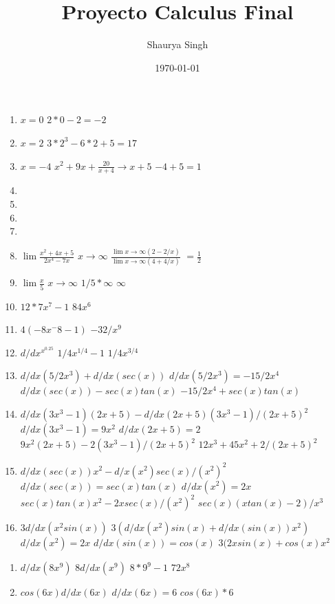 \documentclass[11pt]{article}
\author{Shaurya Singh}
\date{\today}
\title{Proyecto Calculus Final}
\begin{document}
\maketitle
\tableofcontents

\begin{enumerate}
\item \(x=0\)
\(2*0-2= -2\)

\item \(x=2\)
\(3*2^3-6*2+5 = 17\)

\item \(x=-4\)
\(x^2+9x+\frac{20}{x+4} \rightarrow x+5\)
\(-4+5 = 1\)

\item 


\item 


\item 


\item 


\item \(\lim \frac{x^2+4x+5}{2x^{4}-7x}\)
\(x \rightarrow \infty\)
\(\frac{\lim x \rightarrow \infty (2-2/x)}{\lim x\rightarrow \infty (4+4/x)}\)
\(=\frac{1}{2}\)

\item \(\lim\frac{x}{5}\)
\(x \rightarrow \infty\)
\(1/5 * \infty\)
\(\infty\)

\item \(12 * 7x^7-1\)
\(84x^6\)

\item \(4(-8x^-8-1)\)
\(-32/x^9\)

\item \(d/dx^{x^{0.25}}\)
\(1/4x^{1/4}-1\)
\(1/4x^{3/4}\)

\item \(d/dx (5/2x^3) + d/dx (sec(x))\)
\(d/dx (5/2x^3)= -15/2x^4\)
\(d/dx(sec(x)) - sec(x) tan(x)\)
\(-15/2x^4 + sec(x)tan(x)\)

\item \(d/dx (3x^3-1)(2x+5)-d/dx(2x+5)(3x^3-1) / (2x+5)^2\)
\(d/dx(3x^3-1)=9x^2\)
\(d/dx(2x+5)=2\)
\(9x^2(2x+5)-2(3x^3-1) / (2x+5)^2\)
\(12x^3+45x^2+2 / (2x+5)^2\)

\item \(d/dx(sec(x))x^2-d/x(x^2)sec(x) / (x^2)^2\)
\(d/dx(sec(x)) = sec(x)tan(x)\)
\(d/dx (x^2)=2x\)
\(sec(x)tan(x)x^2-2x sec(x) / (x^2)^2\)
\(sec(x)(xtan(x)-2) / x^3\)

\item \(3 d/dx (x^2sin(x))\)
\(3(d/dx(x^2)sin(x)+d/dx(sin(x))x^2)\)
\(d/dx (x^2) = 2x\)
\(d/dx (sin(x))=cos(x)\)
\(3(2x sin(x)+cos(x)x^2\)
\end{enumerate}


\begin{enumerate}
\item \(d/dx (8x^9)\)
\(8d/dx(x^9)\)
\(8*9^9-1\)
\(72x^8\)

\item \(cos(6x)d/dx(6x)\)
\(d/dx (6x) = 6\)
\(cos(6x) * 6\)
\end{enumerate}
\end{document}
